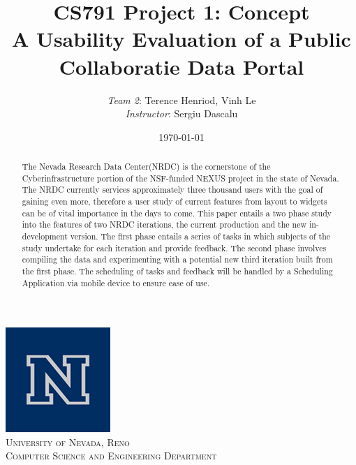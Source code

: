\documentclass{article}
\title{CS791 Project 1: Concept \\ A Usability Evaluation of a Public Collaboratie Data Portal}
\author{\emph{Team 2}: Terence Henriod, Vinh Le \\ \emph{Instructor}: Sergiu Dascalu}
\date{\today}
\begin{document}

\clearpage            %

\maketitle
\begin{center}
\includegraphics[scale=0.4]{unr-logo} \\[0.5cm]
\textsc{\Large University of Nevada, Reno} \\[0.5cm]
\textsc{\large Computer Science and Engineering Department} \\
\end{center}

\thispagestyle{empty} %

\vspace{10mm}

\begin{abstract}
The Nevada Research Data Center(NRDC) is the cornerstone of the Cyberinfrastructure portion of the NSF-funded NEXUS project in the state of Nevada. The NRDC currently services approximately three thousand users with the goal of gaining even more, therefore a user study of current features from layout to widgets can be of vital importance in the days to come. This paper entails a two phase study into the features of two NRDC iterations, the current production and the new in-development version. The first phase entails a series of tasks in which subjects of the study undertake for each iteration and provide feedback. The second phase involves compiling the data and experimenting with a potential new third iteration built from the first phase. The scheduling of tasks and feedback will be handled by a Scheduling Application via mobile device to ensure ease of use.
\end{abstract}
\end{document}
